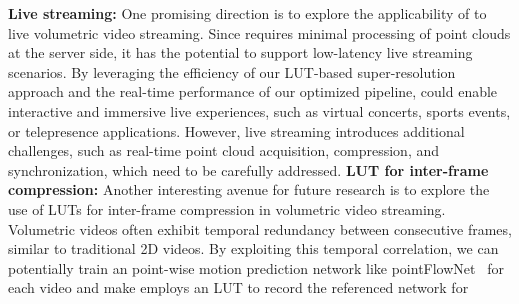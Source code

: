 
\textbf{Live streaming:} One promising direction is to explore the applicability of \name to live volumetric video streaming. Since \name requires minimal processing of point clouds at the server side, it has the potential to support low-latency live streaming scenarios. By leveraging the efficiency of our LUT-based super-resolution approach and the real-time performance of our optimized pipeline, \name could enable interactive and immersive live experiences, such as virtual concerts, sports events, or telepresence applications. However, live streaming introduces additional challenges, such as real-time point cloud acquisition, compression, and synchronization, which need to be carefully addressed.
\textbf{LUT for inter-frame compression:} Another interesting avenue for future research is to explore the use of LUTs for inter-frame compression in volumetric video streaming. Volumetric videos often exhibit temporal redundancy between consecutive frames, similar to traditional 2D videos. By exploiting this temporal correlation, we can potentially train an point-wise motion prediction network like pointFlowNet~\cite{behl2019pointflownet} for each video and make employs an LUT to record the referenced network for